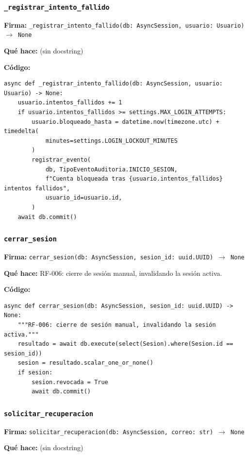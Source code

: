 \documentclass[11pt,a4paper]{article}
\begin{document}
\subsubsection*{\texttt{\_registrar\_intento\_fallido}}
\textbf{Firma:} \texttt{\_registrar\_intento\_fallido(db: AsyncSession, usuario: Usuario) $\rightarrow$ None}

\textbf{Qué hace:} (sin docstring)

\textbf{Código:}
\begin{lstlisting}
async def _registrar_intento_fallido(db: AsyncSession, usuario: Usuario) -> None:
    usuario.intentos_fallidos += 1
    if usuario.intentos_fallidos >= settings.MAX_LOGIN_ATTEMPTS:
        usuario.bloqueado_hasta = datetime.now(timezone.utc) + timedelta(
            minutes=settings.LOGIN_LOCKOUT_MINUTES
        )
        registrar_evento(
            db, TipoEventoAuditoria.INICIO_SESION,
            f"Cuenta bloqueada tras {usuario.intentos_fallidos} intentos fallidos",
            usuario_id=usuario.id,
        )
    await db.commit()
\end{lstlisting}

\subsubsection*{\texttt{cerrar\_sesion}}
\textbf{Firma:} \texttt{cerrar\_sesion(db: AsyncSession, sesion\_id: uuid.UUID) $\rightarrow$ None}

\textbf{Qué hace:} RF-006: cierre de sesión manual, invalidando la sesión activa.

\textbf{Código:}
\begin{lstlisting}
async def cerrar_sesion(db: AsyncSession, sesion_id: uuid.UUID) -> None:
    """RF-006: cierre de sesión manual, invalidando la sesión activa."""
    resultado = await db.execute(select(Sesion).where(Sesion.id == sesion_id))
    sesion = resultado.scalar_one_or_none()
    if sesion:
        sesion.revocada = True
        await db.commit()
\end{lstlisting}

\subsubsection*{\texttt{solicitar\_recuperacion}}
\textbf{Firma:} \texttt{solicitar\_recuperacion(db: AsyncSession, correo: str) $\rightarrow$ None}

\textbf{Qué hace:} (sin docstring)
\end{document}
